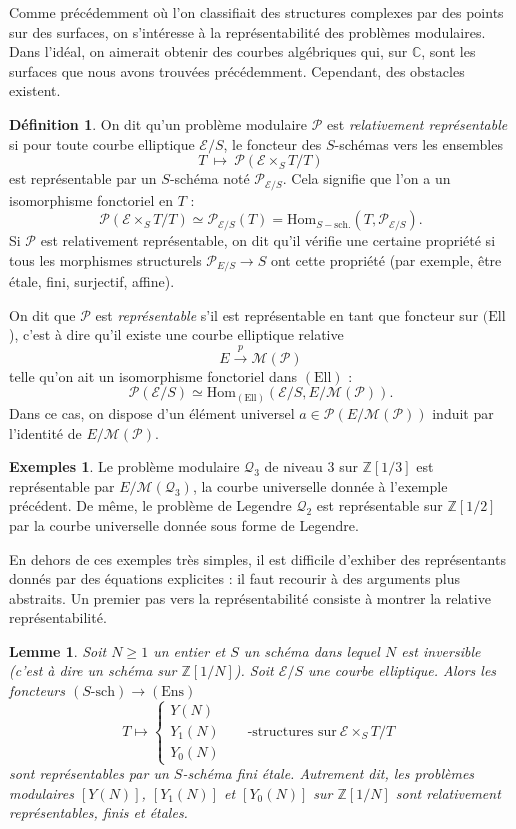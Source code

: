 \documentclass[11pt,a4paper]{article}
\newcommand{\Z}{\mathbb{Z}}
\newcommand{\C}{\mathbb{C}}
\newcommand{\E}{\mathcal{E}}
\renewcommand{\Pr}{\mathcal{P}}
\newcommand{\Qr}{\mathcal{Q}}
\newcommand{\M}{\mathcal{M}}
\newcommand{\vers}{\longrightarrow}
\newcommand{\Hom}{\mathrm{Hom}}
\newcommand{\Ell}{\mathrm{Ell}}
\newtheorem*{lem}{Lemme}
\theoremstyle{definition}
\newtheorem*{defi}{Définition}
\newtheorem*{ex}{Exemples}
\begin{document}
Comme précédemment où l'on classifiait des structures complexes par des points sur des surfaces, on s'intéresse à la représentabilité des problèmes modulaires. Dans l'idéal, on aimerait obtenir des courbes algébriques qui, sur $\C$, sont les surfaces que nous avons trouvées précédemment. Cependant, des obstacles existent.

\begin{defi}
On dit qu'un problème modulaire $\Pr$ est \emph{relativement représentable} si pour toute courbe elliptique $\E/S$, le foncteur des $S$-schémas vers les ensembles
$$T \ \longmapsto\ \Pr(\E\times_S T / T)$$
est représentable par un $S$-schéma noté $\Pr_{\E/S}$. Cela signifie que l'on a un isomorphisme fonctoriel en $T$ :
$$\Pr(\E\times_S T / T) \simeq \Pr_{\E/S}(T) = \Hom_{S-\text{sch.}}(T, \Pr_{\E/S}).$$
Si $\Pr$ est relativement représentable, on dit qu'il vérifie une certaine propriété si tous les morphismes structurels $\Pr_{E/S}\vers S$ ont cette propriété (par exemple, être étale, fini, surjectif, affine).

On dit que $\Pr$ est \emph{représentable} s'il est représentable en tant que foncteur sur $(\Ell$), c'est à dire qu'il existe une courbe elliptique relative
$$E \overset{p}\vers \M(\Pr)$$
telle qu'on ait un isomorphisme fonctoriel dans $(\Ell)$ :
$$\Pr(\E/S) \simeq \Hom_{(\Ell)}(\E/S, E/\M(\Pr)).$$
Dans ce cas, on dispose d'un élément universel $a\in \Pr(E/\M(\Pr))$ induit par l'identité de $E/\M(\Pr)$. 
\end{defi}

\begin{ex}
Le problème modulaire $\Qr_3$ de niveau 3 sur $\Z[1/3]$ est représentable par $E/\M(\Qr_3)$, la courbe universelle donnée à l'exemple précédent. De même, le problème de Legendre $\Qr_2$ est représentable sur $\Z[1/2]$ par la courbe universelle donnée sous forme de Legendre.
\end{ex}

En dehors de ces exemples très simples, il est difficile d'exhiber des représentants donnés par des équations explicites : il faut recourir à des arguments plus abstraits. Un premier pas vers la représentabilité consiste à montrer la relative représentabilité.

\begin{lem}
Soit $N\geq 1$ un entier et $S$ un schéma dans lequel $N$ est inversible (c'est à dire un schéma sur $\Z[1/N]$). Soit $\E/S$ une courbe elliptique. Alors les foncteurs
$(S\text{-}\mathrm{sch})\vers(\mathrm{Ens})$
$$T \longmapsto
\begin{cases}
Y(N)\\
Y_1(N) \qquad \text{-structures sur}\ \E \times_S T/T \\
Y_0(N)
\end{cases}$$
sont représentables par un $S$-schéma fini étale. Autrement dit, les problèmes modulaires $[Y(N)]$, $[Y_1(N)]$ et $[Y_0(N)]$ sur $\Z[1/N]$ sont relativement représentables, finis et étales.
\end{lem}
\end{document}
